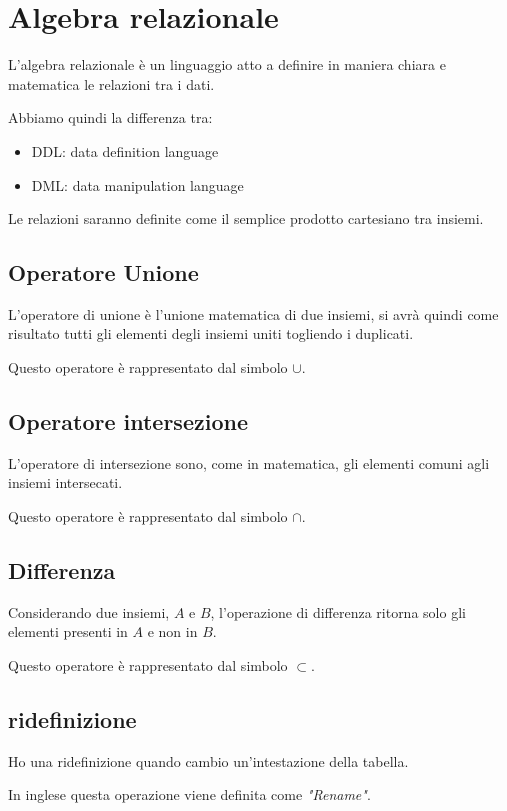 \chapter{Algebra relazionale}

L'algebra relazionale è un linguaggio atto a definire in maniera chiara e matematica le relazioni tra i dati.

Abbiamo quindi la differenza tra:

\begin{itemize}
    \item DDL: data definition language
    \item DML: data manipulation language
\end{itemize}

Le relazioni saranno definite come il semplice prodotto cartesiano tra insiemi.

\section{Operatore Unione}
L'operatore di unione è l'unione matematica di due insiemi, si avrà quindi come risultato tutti gli elementi degli insiemi uniti togliendo i duplicati.

Questo operatore è rappresentato dal simbolo $\cup$.

\section{Operatore intersezione}
L'operatore di intersezione sono, come in matematica, gli elementi comuni agli insiemi intersecati.

Questo operatore è rappresentato dal simbolo $\cap$.
\section{Differenza}
Considerando due insiemi, $A$ e $B$, l'operazione di differenza ritorna solo gli elementi presenti in $A$ e non in $B$.

Questo operatore è rappresentato dal simbolo $\subset$.

\section{ridefinizione}

Ho una ridefinizione quando cambio un'intestazione della tabella.

In inglese questa operazione viene definita come \textit{"Rename"}.

